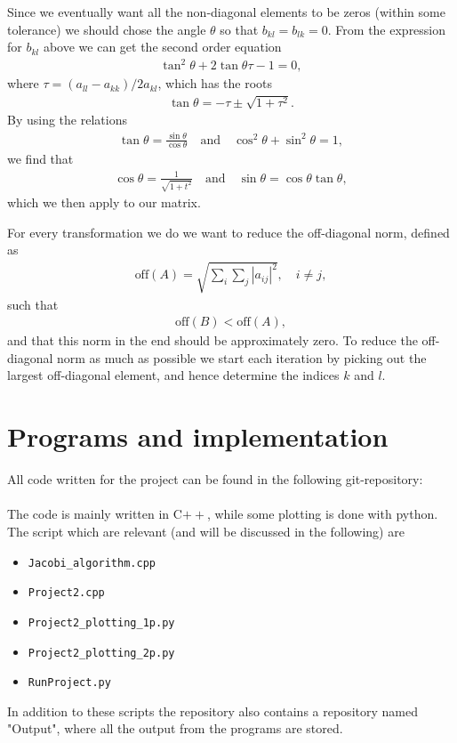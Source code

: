 \documentclass[12pt, a4paper]{article}
\begin{document}
Since we eventually want all the non-diagonal elements to be zeros (within some tolerance) we should chose 
the angle $\theta$ so that $b_{kl} = b_{lk} = 0$. From the expression for $b_{kl}$ above we can get the 
second order equation 
\begin{align*}
\tan^2\theta + 2\tan\theta\tau -1 = 0, 
\end{align*}
where $\tau = (a_{ll}-a_{kk})/2a_{kl}$, which has the roots 
\begin{align*}
\tan\theta = - \tau \pm \sqrt{1 + \tau^2}. 
\end{align*}
By using the relations 
\begin{align*}
\tan\theta = \frac{\sin\theta}{\cos\theta} \quad \mbox{and} \quad \cos^2\theta + \sin^2\theta = 1, 
\end{align*}  
we find that 
\begin{align*}
\cos\theta = \frac{1}{\sqrt{1+t^2}} \quad \mbox{and} \quad \sin\theta = \cos\theta\tan\theta, 
\end{align*}  
which we then apply to our matrix.   
  
For every transformation we do we want to reduce the off-diagonal norm, defined as  
\begin{align*}
\mbox{off}(A) = \sqrt{\sum_i \sum_j |a_{ij}|^2},\quad i\neq j, 
\end{align*}    
such that 
\begin{align*}
\mbox{off}(B) < \mbox{off}(A), 
\end{align*}  
and that this norm in the end should be approximately zero. To reduce the off-diagonal norm as much as 
possible we start each iteration by picking out the largest off-diagonal element, and hence determine 
the indices $k$ and $l$.       
  
\section{Programs and implementation}

All code written for the project can be found in the following git-repository:  \vspace{0.5cm} \\ 
 \vspace{0.5cm} \\ 
The code is mainly written in C$++$, while some plotting is done with python. The script which are 
relevant (and will be discussed in the following) are 
\begin{itemize}
\item \texttt{Jacobi\_algorithm.cpp}
\item \texttt{Project2.cpp} 
\item \texttt{Project2\_plotting\_1p.py}
\item \texttt{Project2\_plotting\_2p.py}
\item \texttt{RunProject.py}
\end{itemize}
In addition to these scripts the repository also contains a repository named "Output", where all the 
output from the programs are stored. 
\end{document}
